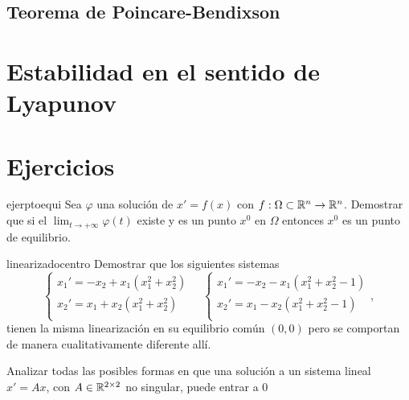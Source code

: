 \subsection{Teorema de Poincare-Bendixson}

\section{Estabilidad en el sentido de Lyapunov}











\section*{Ejercicios}
\begin{ejercicio}{ejerptoequi} Sea $\varphi$ una solución de $x'=f(x)$ con
$f:\Omega\subset\mathbb{R}^n\to\mathbb{R}^n$. Demostrar que si el
$\lim_{t\to+\infty}\varphi(t)$ existe y es un punto $x^0$ en $\Omega$
entonces $x^0$ es un punto de equilibrio.
\end{ejercicio}

\begin{ejercicio}{linearizadocentro} Demostrar que los
siguientes sistemas
\[
    \left\{%
\begin{array}{l}
    x_1'=-x_2+x_1(x_1^2+x_2^2) \\
    x_2'=x_1+ x_2(x_1^2+x_2^2)\\
\end{array}
\right.\quad \left\{%
\begin{array}{l}
    x_1'=-x_2-x_1(x_1^2+x_2^2-1) \\
    x_2'=x_1-x_2(x_1^2+x_2^2-1)\\
\end{array} ,%
\right.
\]
tienen la  misma linearización en su equilibrio común $(0,0)$ pero
se comportan de manera cualitativamente diferente allí.
\end{ejercicio}

\begin{ejercicio}{} Analizar todas las posibles formas en que una
solución a un sistema lineal $x'=Ax$, con $A\in\mathbb{R}^{2\times 2}$ no
singular, puede entrar a $0$
\end{ejercicio}

